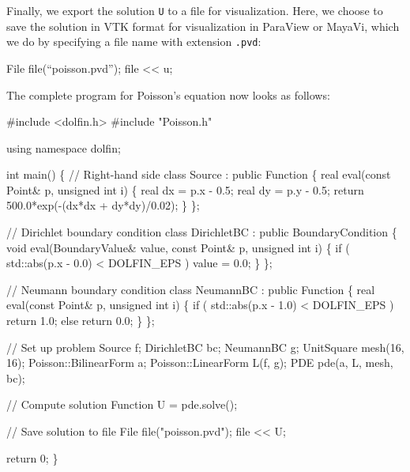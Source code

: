 Finally, we export the solution \texttt{U} to a file for
visualization. Here, we choose to save the solution in VTK format for
visualization in ParaView or MayaVi, which we do by specifying a file
name with extension \texttt{.pvd}:
\begin{code}
  File file(``poisson.pvd'');
  file << u;
\end{code}

The complete program for Poisson's equation now looks as follows:
\small
\begin{code}
  #include <dolfin.h>
  #include "Poisson.h"

  using namespace dolfin;

  int main()
  \{
    // Right-hand side                                                                                          
    class Source : public Function
    \{
      real eval(const Point& p, unsigned int i)
      \{
        real dx = p.x - 0.5;
        real dy = p.y - 0.5;
        return 500.0*exp(-(dx*dx + dy*dy)/0.02);
      \}
    \};

    // Dirichlet boundary condition                                                                             
    class DirichletBC : public BoundaryCondition
    \{
      void eval(BoundaryValue& value, const Point& p, unsigned int i)
      \{
        if ( std::abs(p.x - 0.0) < DOLFIN_EPS )
          value = 0.0;
      \}
    \};

    // Neumann boundary condition                                                                               
    class NeumannBC : public Function
    \{
      real eval(const Point& p, unsigned int i)
      \{
        if ( std::abs(p.x - 1.0) < DOLFIN_EPS )
          return 1.0;
        else
          return 0.0;
      \}
    \};

    // Set up problem                                                                                           
    Source f;
    DirichletBC bc;
    NeumannBC g;
    UnitSquare mesh(16, 16);
    Poisson::BilinearForm a;
    Poisson::LinearForm L(f, g);
    PDE pde(a, L, mesh, bc);

    // Compute solution                                                                                         
    Function U = pde.solve();

    // Save solution to file                                                                                    
    File file("poisson.pvd");
    file << U;

    return 0;
  \}
\end{code}
\normalsize

